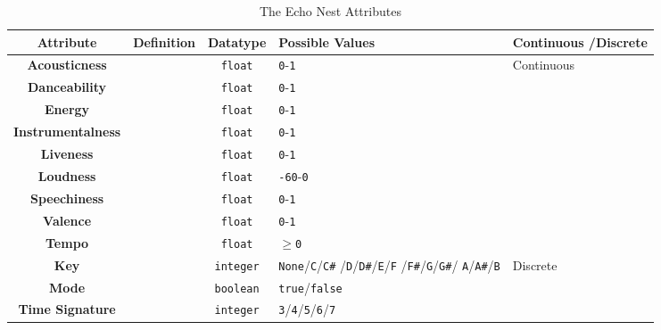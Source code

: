 \begin{longtable}[c]{|c|c|c|p{5em}|p{5.5em}|}
    \caption{The Echo Nest Attributes}\\%
    \toprule
    \textbf{Attribute} & \textbf{Definition} & \textbf{Datatype} & \textbf{Possible Values} & \textbf{Continuous /Discrete} \\
    \midrule
    \endfirsthead

    \textbf{Acousticness} & & \texttt{float} & \texttt{0}-\texttt{1} & \multirow{9}{*}{Continuous}\\*
    \cmidrule{1-4}
    \textbf{Danceability} & & \texttt{float} & \texttt{0}-\texttt{1} & \\*\cmidrule{1-4}
    \textbf{Energy} & & \texttt{float} & \texttt{0}-\texttt{1} & \\*\cmidrule{1-4}
    \textbf{Instrumentalness} & & \texttt{float} & \texttt{0}-\texttt{1} & \\*\cmidrule{1-4}
    \textbf{Liveness} & & \texttt{float} & \texttt{0}-\texttt{1} & \\*\cmidrule{1-4}
    \textbf{Loudness} & & \texttt{float} & \texttt{-60}-\texttt{0} & \\*\cmidrule{1-4}
    \textbf{Speechiness} & & \texttt{float} & \texttt{0}-\texttt{1} & 
    \\*\cmidrule{1-4}
    \textbf{Valence} & & \texttt{float} & \texttt{0}-\texttt{1} & \\*\cmidrule{1-4}
    \textbf{Tempo} & & \texttt{float} & \(\ge\)\texttt{0} & \\*
    \midrule
    \textbf{Key} & & \texttt{integer} & \texttt{None}/\texttt{C}/\texttt{C\#} /\texttt{D}/\texttt{D\#}/\texttt{E}/\texttt{F} /\texttt{F\#}/\texttt{G}/\texttt{G\#}/ \texttt{A}/\texttt{A\#}/\texttt{B} & \multirow{3}{*}{Discrete}\\*
    \cmidrule{1-4}
    \textbf{Mode} & & \texttt{boolean} & \texttt{true}/\texttt{false} & \\*
    \cmidrule{1-4}
    \textbf{Time Signature} & & \texttt{integer} & \texttt{3}/\texttt{4}/\texttt{5}/\texttt{6}/\texttt{7} & \\*
    \midrule
    
\end{longtable}
